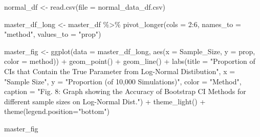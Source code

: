 \documentclass[12pt]{article}
\newenvironment{Shaded}{\begin{snugshade}}{\end{snugshade}}
\newcommand{\AttributeTok}[1]{\textcolor[rgb]{0.77,0.63,0.00}{#1}}
\newcommand{\DecValTok}[1]{\textcolor[rgb]{0.00,0.00,0.81}{#1}}
\newcommand{\FunctionTok}[1]{\textcolor[rgb]{0.00,0.00,0.00}{#1}}
\newcommand{\NormalTok}[1]{#1}
\newcommand{\OtherTok}[1]{\textcolor[rgb]{0.56,0.35,0.01}{#1}}
\newcommand{\SpecialCharTok}[1]{\textcolor[rgb]{0.00,0.00,0.00}{#1}}
\newcommand{\StringTok}[1]{\textcolor[rgb]{0.31,0.60,0.02}{#1}}
\begin{document}
\begin{Shaded}
\begin{Highlighting}[]
\NormalTok{normal\_df }\OtherTok{\textless{}{-}} \FunctionTok{read.csv}\NormalTok{(}\AttributeTok{file =} \StringTok{\textquotesingle{}normal\_data\_df.csv\textquotesingle{}}\NormalTok{)}

\NormalTok{master\_df\_long }\OtherTok{\textless{}{-}}\NormalTok{ master\_df }\SpecialCharTok{\%\textgreater{}\%}
  \FunctionTok{pivot\_longer}\NormalTok{(}\AttributeTok{cols =} \DecValTok{2}\SpecialCharTok{:}\DecValTok{6}\NormalTok{, }\AttributeTok{names\_to =} \StringTok{"method"}\NormalTok{, }\AttributeTok{values\_to =} \StringTok{"prop"}\NormalTok{) }
    
\NormalTok{master\_fig }\OtherTok{\textless{}{-}} \FunctionTok{ggplot}\NormalTok{(}\AttributeTok{data =}\NormalTok{ master\_df\_long, }
                    \FunctionTok{aes}\NormalTok{(}\AttributeTok{x =}\NormalTok{ Sample\_Size, }\AttributeTok{y =}\NormalTok{ prop, }\AttributeTok{color =}\NormalTok{ method)) }\SpecialCharTok{+} 
  \FunctionTok{geom\_point}\NormalTok{() }\SpecialCharTok{+} \FunctionTok{geom\_line}\NormalTok{() }\SpecialCharTok{+} 
  \FunctionTok{labs}\NormalTok{(}\AttributeTok{title =} \StringTok{"Proportion of CIs that Contain the True Parameter from Log{-}Normal Distibution"}\NormalTok{, }
       \AttributeTok{x =} \StringTok{"Sample Size"}\NormalTok{, }
       \AttributeTok{y =} \StringTok{"Proportion (of 10,000 Simulations)"}\NormalTok{, }\AttributeTok{color =} \StringTok{"Method"}\NormalTok{,}
       \AttributeTok{caption =} \StringTok{"Fig. 8: Graph showing the Accuracy of Bootstrap CI Methods for different sample sizes on Log{-}Normal Dist."}\NormalTok{) }\SpecialCharTok{+}
  \FunctionTok{theme\_light}\NormalTok{() }\SpecialCharTok{+}
  \FunctionTok{theme}\NormalTok{(}\AttributeTok{legend.position=}\StringTok{"bottom"}\NormalTok{)}

\NormalTok{master\_fig}
\end{Highlighting}
\end{Shaded}




\end{document}
